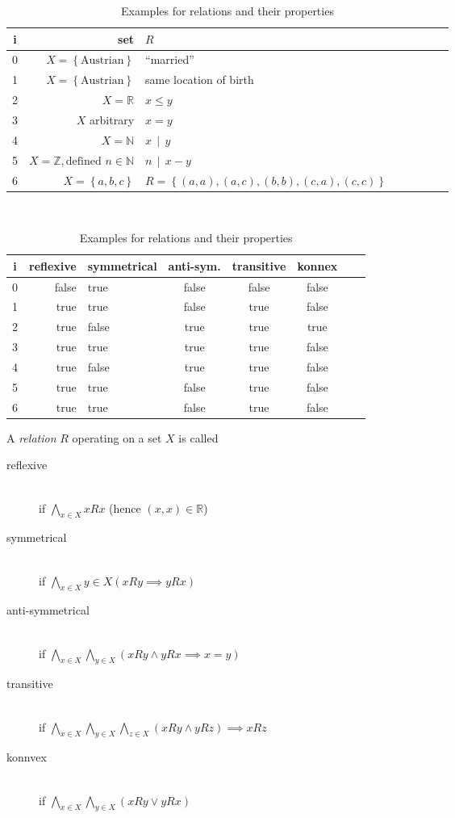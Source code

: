 \documentclass[a4paper,landscape,twocolumn]{article}
\newcommand\set[1]{\left\{#1\right\}}
\newcommand\divides[2]{#1\,\mid\,#2}
\begin{document}
\begin{table}[!ht]
  \begin{center}
    \begin{tabular}{crlccccc}
     \hline \hline
      i & set & $R$ \\
     \hline
      0 & $X = \set{\text{Austrian}}$ & \enquote{married} \\
      1 & $X = \set{\text{Austrian}}$ & same location of birth \\
      2 & $X = \mathbb{R}$ & $x \leq y$ \\
      3 & $X$ arbitrary & $x = y$ \\
      4 & $X = \mathbb{N}$ & $\divides{x}{y}$ \\
      5 & $X = \mathbb{Z}, \text{defined } n \in \mathbb{N}$ & $\divides{n}{x - y}$ \\
      6 & $X = \set{a, b, c}$ & $R = \set{(a, a), (a, c), (b, b), (c, a), (c, c)}$ \\
     \hline \hline
    \end{tabular} \\[5pt]
    \begin{tabular}{crlccccc}
     \hline \hline
        i & reflexive & symmetrical & anti-sym. & transitive & konnex \\
     \hline
        0 & false & true & false & false & false \\
        1 & true & true & false & true & false \\
        2 & true & false & true & true & true \\
        3 & true & true & true & true & false \\
        4 & true & false & true & true & false \\
        5 & true & true & false & true & false \\
        6 & true & true & false & true & false \\
     \hline \hline
    \end{tabular}
    \caption{Examples for relations and their properties}
  \end{center}
\end{table}

A \emph{relation} $R$ operating on a set $X$ is called
\begin{description}
  \item[reflexive] \hfill{} \\
    if $\bigwedge_{x \in X} x R x$ (hence $(x, x) \in \mathbb{R}$)
  \item[symmetrical] \hfill{} \\
    if $\bigwedge_{x \in X}{y \in X} \left(xRy \implies yRx\right)$
  \item[anti-symmetrical] \hfill{} \\
    if $\bigwedge_{x \in X} \bigwedge_{y \in X} (xRy \land yRx \implies x=y)$
  \item[transitive] \hfill{} \\
    if $\bigwedge_{x \in X} \bigwedge_{y \in X} \bigwedge_{z \in X} (xRy \land yRz) \implies xRz$
  \item[konnvex] \hfill{} \\
    if $\bigwedge_{x \in X} \bigwedge_{y \in X} (xRy \lor yRx)$
\end{description}
\end{document}
